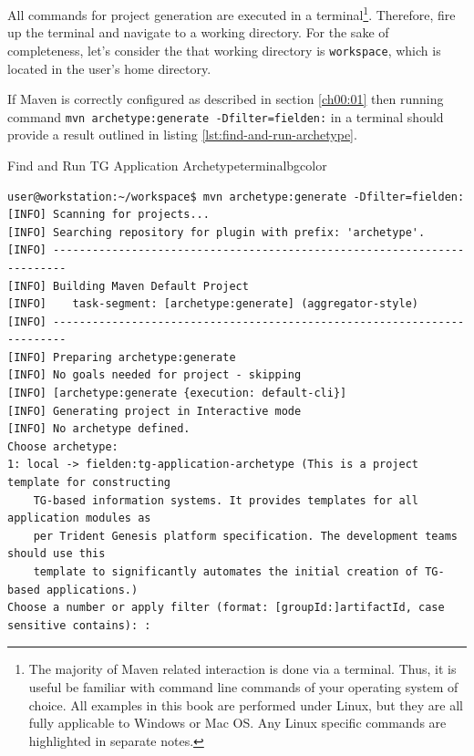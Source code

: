   All commands for project generation are executed in a terminal\footnote{The majority of Maven related interaction is done via a terminal.
  Thus, it is useful be familiar with command line commands of your operating system of choice.
  All examples in this book are performed under Linux, but they are all fully applicable to Windows or Mac OS.
  Any Linux specific commands are highlighted in separate notes.}.
  Therefore, fire up the terminal and navigate to a working directory.
  For the sake of completeness, let's consider the that working directory is \texttt{workspace}, which is located in the user's home directory.
  
  If Maven is correctly configured as described in section \ref{ch00:01} then running command \texttt{mvn archetype:generate -Dfilter=fielden:} in a terminal should provide a result outlined in listing \ref{lst:find-and-run-archetype}.

  \begin{code}{Find and Run TG Application Archetype}{\label{lst:find-and-run-archetype}}{terminalbgcolor}
    \begin{lstlisting}
user@workstation:~/workspace$ mvn archetype:generate -Dfilter=fielden:
[INFO] Scanning for projects...
[INFO] Searching repository for plugin with prefix: 'archetype'.
[INFO] ------------------------------------------------------------------------
[INFO] Building Maven Default Project
[INFO]    task-segment: [archetype:generate] (aggregator-style)
[INFO] ------------------------------------------------------------------------
[INFO] Preparing archetype:generate
[INFO] No goals needed for project - skipping
[INFO] [archetype:generate {execution: default-cli}]
[INFO] Generating project in Interactive mode
[INFO] No archetype defined.
Choose archetype:
1: local -> fielden:tg-application-archetype (This is a project template for constructing 
	TG-based information systems. It provides templates for all application modules as 
	per Trident Genesis platform specification. The development teams should use this 
	template to significantly automates the initial creation of TG-based applications.)
Choose a number or apply filter (format: [groupId:]artifactId, case sensitive contains): : 
    \end{lstlisting}
  \end{code}

